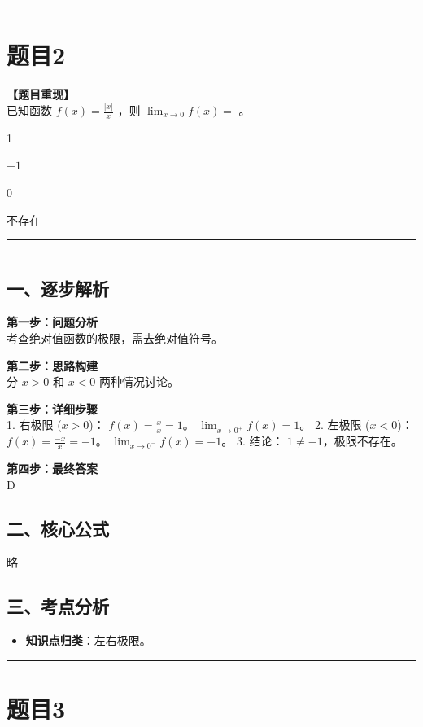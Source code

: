 \documentclass[12pt, a4paper]{ctexart}
\newcommand{\TopSeparator}{
    \par\noindent\rule{\textwidth}{1.5pt}\vspace{0.5em} %
}
\newcommand{\AnalysisSeparator}{
    \par\noindent\rule{\textwidth}{0.5pt}\vspace{0.2em}\hrule\vspace{0.5em} %
}
\newenvironment{RedAnalysis}{
    \par
    \color{red} %
}{
    \par
    \color{black} %
}
\newcommand{\choicesFour}[4]{
    \begin{enumerate}[label=\Alph*., itemsep=0pt, parsep=0pt, topsep=5pt, labelsep=0.5em]
        \begin{minipage}{0.22\linewidth} \item #1 \end{minipage}
        \begin{minipage}{0.22\linewidth} \item #2 \end{minipage}
        \begin{minipage}{0.22\linewidth} \item #3 \end{minipage}
        \begin{minipage}{0.22\linewidth} \item #4 \end{minipage}
    \end{enumerate}
}
\begin{document}
\vspace{2em}

\TopSeparator
\section*{题目2}

\textbf{【题目重现】} \\
已知函数 $ f(x)=\frac{|x|}{x} $ ，则 $ \lim_{x\to0}f(x)= $ \underline{\hspace{1cm}}。
\choicesFour{1}{$-1$}{0}{不存在}

\AnalysisSeparator

\begin{RedAnalysis}

\subsection*{一、逐步解析}

\textbf{第一步：问题分析} \\
考查绝对值函数的极限，需去绝对值符号。

\textbf{第二步：思路构建} \\
分 $x>0$ 和 $x<0$ 两种情况讨论。

\textbf{第三步：详细步骤} \\
1. 右极限 ($x>0$)：
   $f(x) = \frac{x}{x} = 1$。
   $\lim_{x\to 0^+} f(x) = 1$。
2. 左极限 ($x<0$)：
   $f(x) = \frac{-x}{x} = -1$。
   $\lim_{x\to 0^-} f(x) = -1$。
3. 结论：
   $1 \ne -1$，极限不存在。

\textbf{第四步：最终答案} \\
D

\subsection*{二、核心公式}
略

\subsection*{三、考点分析}
\begin{itemize}
    \item \textbf{知识点归类}：左右极限。
\end{itemize}

\end{RedAnalysis}

\vspace{2em}

\TopSeparator
\section*{题目3}
\end{document}
